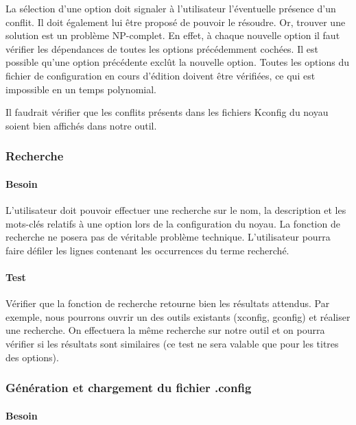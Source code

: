 \documentclass[16pts]{report}
\begin{document}
La sélection d’une option doit signaler à l’utilisateur l’éventuelle présence
d’un conflit. Il doit également lui être proposé de pouvoir le résoudre. Or,
trouver une solution est un problème NP-complet. En effet, à chaque nouvelle
option il faut vérifier les dépendances de toutes les options précédemment
cochées. Il est possible qu’une option précédente exclût la nouvelle option.
Toutes les options du fichier de configuration en cours d’édition doivent être
vérifiées, ce qui est impossible en un temps polynomial.

Il faudrait vérifier que les conflits présents dans les fichiers Kconfig du
noyau soient bien affichés dans notre outil.


\subsubsection{Recherche}
\label{sec:Recherche}
\paragraph{Besoin}
\label{sub:Besoin}

L’utilisateur doit pouvoir effectuer une recherche sur le nom, la description
et les mots-clés relatifs à une option lors de la configuration du noyau. La
fonction de recherche ne posera pas de véritable problème technique.
L’utilisateur pourra faire défiler les lignes contenant les occurrences du
terme recherché.

\paragraph{Test}
\label{sub:Test}

Vérifier que la fonction de recherche retourne bien les résultats attendus. Par
exemple, nous pourrons ouvrir un des outils existants (xconfig, gconfig) et
réaliser une recherche. On effectuera la même recherche sur notre outil et on
pourra vérifier si les résultats sont similaires (ce test ne sera valable que
pour les titres des options).


\subsubsection{Génération et chargement du fichier .config}
\label{sec:Génération et chargement du fichier .config}
\paragraph{Besoin}
\label{sub:Besoin}
\end{document}
